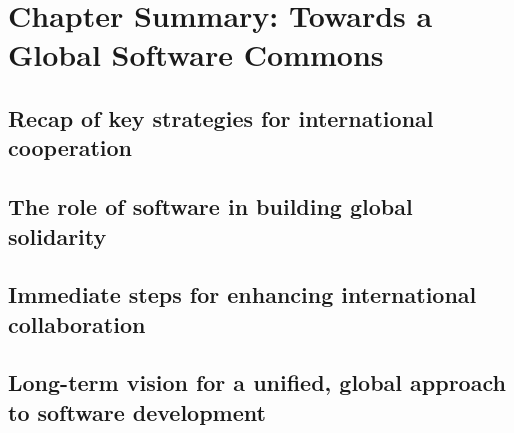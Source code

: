 \newpage

\section{Chapter Summary: Towards a Global Software Commons}
\subsection{Recap of key strategies for international cooperation}
\subsection{The role of software in building global solidarity}
\subsection{Immediate steps for enhancing international collaboration}
\subsection{Long-term vision for a unified, global approach to software development}